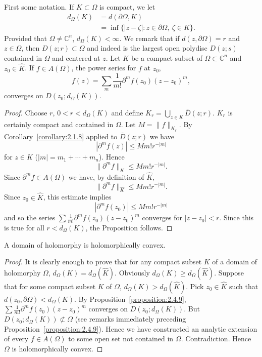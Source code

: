 First some notation. If $K\subset\Omega$ is compact, we let
\begin{align*}
d_\Omega(K)&=d(\partial\Omega,K)\\
&=\inf\{|z-\zeta|:z\in\partial\Omega,\ \zeta\in K\}.
\end{align*}
Provided that $\Omega\neq\mathbb C^n$, $d_\Omega(K)<\infty$. We remark that if $d(z,\partial\Omega)=r$ and $z\in\Omega$, then $D(z;r)\subset\Omega$ and indeed is the largest open polydisc $D(z;s)$ contained in $\Omega$ and centered at $z$.
 Let $K$ be a compact subset of $\Omega\subset\mathbb C^n$ and $z_0\in\widehat K$. If $f\in A(\Omega)$, the power series for $f$ at $z_0$,
\[f(z)=\sum_m\frac1{m!}\partial^m f(z_0)(z-z_0)^m,\]
converges on $D(z_0;d_\Omega(K))$.
\begin{proof}
Choose $r$, $0<r<d_\Omega(K)$ and define $K_r=\bigcup_{z\in K}\bar D(z;r)$. $K_r$ is certainly compact and contained in $\Omega$. Let $M=\|f\|_{K_r}$. By Corollary~\ref{corollary:2.1.8} applied to $\bar D(z;r)$ we have
\[|\partial^m f(z)|\leq Mm!r^{-|m|}\]
for $z\in K$ ($|m|=m_1+\cdots+m_n$). Hence
\[\|\partial^m f\|_K\leq Mm!r^{-|m|}.\]
Since $\partial^m f\in A(\Omega)$ we have, by definition of $\widehat K$,
\[\|\partial^m f\|_{\widehat K}\leq Mm!r^{-|m|}.\]
Since $z_0\in\widehat K$, this estimate implies
\[|\partial^m f(z_0)|\leq Mm!r^{-|m|}\]
and so the series $\sum\frac1{m!}\partial^m f(z_0)(z-z_0)^m$ converges for $|z-z_0|<r$. Since this is true for all $r<d_\Omega(K)$, the Proposition follows.
\end{proof}
 A domain of holomorphy is holomorphically convex.
\begin{proof}
It is clearly enough to prove that for any compact subset $K$ of a domain of holomorphy $\Omega$, $d_\Omega(K)=d_\Omega(\widehat K)$. Obviously $d_\Omega(K)\geq d_\Omega(\widehat K)$. Suppose that for some compact subset $K$ of $\Omega$, $d_\Omega(K)>d_\Omega(\widehat K)$. Pick $z_0\in\widehat K$ such that $d(z_0,\partial\Omega)<d_\Omega(K)$. By Proposition~\ref{proposition:2.4.9}, $\sum\frac1{m!}\partial^m f(z_0)(z-z_0)^m$ converges on $D(z_0;d_\Omega(K))$. But $D(z_0;d_\Omega(K))\not\subset\Omega$ (see remarks immediately preceding Proposition~\ref{proposition:2.4.9}). Hence we have constructed an analytic extension of every $f\in A(\Omega)$ to some open set not contained in $\Omega$. Contradiction. Hence $\Omega$ is holomorphically convex.
\end{proof}
